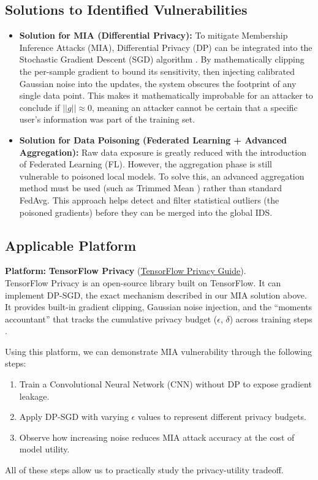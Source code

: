 \documentclass[letterpaper]{article}
\begin{document}
\subsection*{Solutions to Identified Vulnerabilities}
\begin{itemize}
    \item \textbf{Solution for MIA (Differential Privacy):} To mitigate Membership Inference Attacks (MIA), Differential Privacy (DP) can be integrated into the Stochastic Gradient Descent (SGD) algorithm \cite{abadi2016}. By mathematically clipping the per-sample gradient to bound its sensitivity, then injecting calibrated Gaussian noise into the updates, the system obscures the footprint of any single data point. This makes it mathematically improbable for an attacker to conclude if $||g|| \approx 0$, meaning an attacker cannot be certain that a specific user's information was part of the training set.
    \item \textbf{Solution for Data Poisoning (Federated Learning + Advanced Aggregation):} Raw data exposure is greatly reduced with the introduction of Federated Learning (FL). However, the aggregation phase is still vulnerable to poisoned local models. To solve this, an advanced aggregation method must be used (such as Trimmed Mean \cite{yin2018}) rather than standard FedAvg. This approach helps detect and filter statistical outliers (the poisoned gradients) before they can be merged into the global IDS.
\end{itemize}

\subsection*{Applicable Platform}
\textbf{Platform:} \textbf{TensorFlow Privacy} (\href{https://www.tensorflow.org/responsible_ai/privacy/guide}{TensorFlow Privacy Guide}). \\
TensorFlow Privacy is an open-source library built on TensorFlow. It can implement DP-SGD, the exact mechanism described in our MIA solution above. It provides built-in gradient clipping, Gaussian noise injection, and the ``moments accountant'' that tracks the cumulative privacy budget ($\epsilon$, $\delta$) across training steps \cite{abadi2016}. 

Using this platform, we can demonstrate MIA vulnerability through the following steps:
\begin{enumerate}
    \item Train a Convolutional Neural Network (CNN) without DP to expose gradient leakage.
    \item Apply DP-SGD with varying $\epsilon$ values to represent different privacy budgets.
    \item Observe how increasing noise reduces MIA attack accuracy at the cost of model utility.
\end{enumerate}
All of these steps allow us to practically study the privacy-utility tradeoff.
\pagebreak
\end{document}
